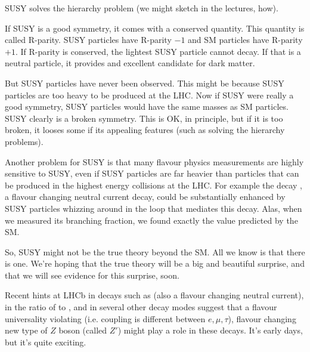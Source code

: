 SUSY solves the hierarchy problem (we might sketch in the lectures, how). 

If SUSY is a good symmetry, it comes with a conserved quantity. This quantity is called R-parity. SUSY particles have R-parity $-1$ and SM particles have R-parity $+1$. If R-parity is conserved, the lightest SUSY particle cannot decay. If that is a neutral particle, it provides and excellent candidate for dark matter.

But SUSY particles have never been observed. This might be because SUSY particles are too heavy to be produced at the LHC. Now if SUSY were really a good symmetry, SUSY particles would have the same masses as SM particles. SUSY clearly is a broken symmetry. This is OK, in principle, but if it is too broken, it looses some if its appealing features (such as solving the hierarchy problems).

Another problem for SUSY is that many flavour physics measurements are highly sensitive to SUSY, even if SUSY particles are far heavier than particles that can be produced in the highest energy collisions at the LHC. For example the decay , a flavour changing neutral current decay, could be substantially enhanced by SUSY particles whizzing around in the loop that mediates this decay. Alas, when we measured its branching fraction, we found exactly the value predicted by the SM.

So, SUSY might not be the true theory beyond the SM. All we know is that there is one. We're hoping that the true theory will be a big and beautiful surprise, and that we will see evidence for this surprise, soon.

Recent hints at LHCb in decays such as  (also a flavour changing neutral current), in the ratio of 
 to , and in several other decay modes suggest that a flavour universality violating (i.e. coupling is different between $e, \mu, \tau$), flavour changing new type of $Z$ boson (called $Z'$) might play a role in these decays. It's early days, but it's quite exciting.

